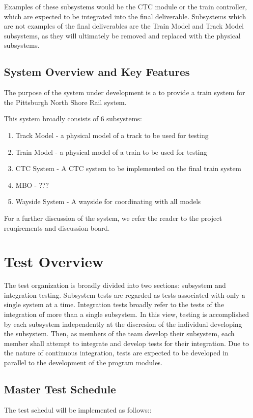 \documentclass[]{article}
\begin{document}
Examples of these subsystems would be the CTC module or the train controller, which are expected to be integrated into the final deliverable. Subsystems which are not examples of the final deliverables are the Train Model and Track Model subsystems, as they will ultimately be removed and replaced with the physical subsystems.

\subsection{System Overview and Key Features}
The purpose of the system under development is a to provide a train system for the Pittsburgh North Shore Rail system.

This system broadly consists of 6 subsystems:
\begin{enumerate}
	\item  Track Model - a physical model of a track to be used for testing
	\item Train Model - a physical model of a train to be used for testing
	\item CTC System - A CTC system to be implemented on the final train system
	\item MBO - ???
	\item Wayside System - A wayside for coordinating with all models
\end{enumerate}
For a further discussion of the system, we refer the reader to the project reuqirements and discussion board.

\section{Test Overview}
The test organization is broadly divided into two sections: subsystem and integration testing. Subsystem tests are regarded as tests associated with only a single system at a time. Integration tests broadly refer to the tests of the integration of more than a single subsystem. In this view, testing is accomplished by each subsystem independently at the discresion of the individual developing the subsystem. Then, as members of the team develop their subsystem, each member shall attempt to integrate and develop tests for their integration. Due to the nature of continuous integration, tests are expected to be developed in parallel to the development of the program modules. 

\subsection{Master Test Schedule}
The test schedul will be implemented as follows::
\end{document}
